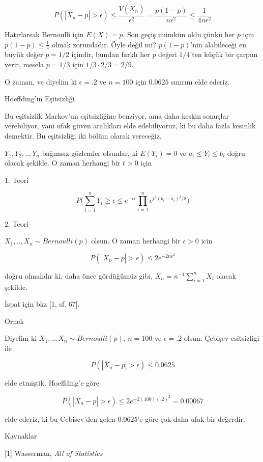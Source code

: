 \documentclass[12pt,fleqn]{article}\usepackage{../../common}
\begin{document}
$$ 
P(|\overline{X}_n - p| > \epsilon) \le \frac{V(\overline{X}_n)}{\epsilon^2}
= \frac{p(1-p)}{n\epsilon^2} \le \frac{1}{4n\epsilon^2}
$$

Hatırlarsak Bernoulli için $E(X)=p$. Son geçiş mümkün oldu çünkü her $p$
için $p(1-p) \le \frac{1}{4}$ olmak zorundadır. Öyle değil mi? $p(1-p)$'nin
alabileceği en büyük değer $p=1/2$ içindir, bundan farklı her $p$ değeri
$1/4$'ten küçük bir çarpım verir, mesela $p=1/3$ için
$1/3 \cdot 2/3 = 2/9$.

O zaman, ve diyelim ki $\epsilon = .2$ ve $n=100$ için $0.0625$ sınırını
elde ederiz. 

Hoeffding'in Eşitsizliği

Bu eşitsizlik Markov'un eşitsizliğine benziyor, ama daha keskin sonuçlar
verebiliyor, yani ufak güven aralıkları elde edebiliyoruz, ki bu daha fazla
kesinlik demektir. Bu eşitsizliği iki bölüm olarak vereceğiz, 

$Y_1,Y_2,..,Y_n$ bağımsız gözlemler olsunlar, ki $E(Y_i)=0$ ve
$a_i \le Y_i \le b_i$ doğru olacak şekilde. O zaman herhangi bir $t>0$ için 

1. Teori

$$ 
P \bigg( 
\sum _{i=1}^{n} Y_i \ge \epsilon \le e^{-t\epsilon} 
\prod _{i=1}^{n} e^{{t^2}(b_i-a_i)^2 / 8}
\bigg)
$$

2. Teori

$X_1,..,X_n \sim Bernoulli(p)$ olsun. O zaman herhangi bir $\epsilon > 0$ icin

$$ P(|\overline{X}_n -p| > \epsilon ) \le 2e^{-2n\epsilon^2}$$

doğru olmalıdır ki, daha önce gördüğümüz gibi,
$\overline{X}_n = n^{-1}\sum _{i=1}^{n} X_i$ olacak şekilde. 

İspat için bkz [1, sf. 67]. 

Örnek

Diyelim ki $X_1,..,X_n \sim Bernoulli(p)$. $n=100$ ve $\epsilon=.2$
olsun. Çebişev esitsizligi ile 

$$ P(|\overline{X}_n - p| > \epsilon ) \le 0.0625 $$

elde etmiştik. Hoeffding'e göre

$$ 
P(|\overline{X}_n - p| > \epsilon ) \le 2e^{-2 (100)(.2)^2} = 0.00067
$$

elde ederiz, ki bu Cebisev'den gelen $0.0625$'e göre çok daha ufak bir
değerdir.

Kaynaklar

[1] Wasserman, {\em All of Statistics}

\newpage
\end{document}
